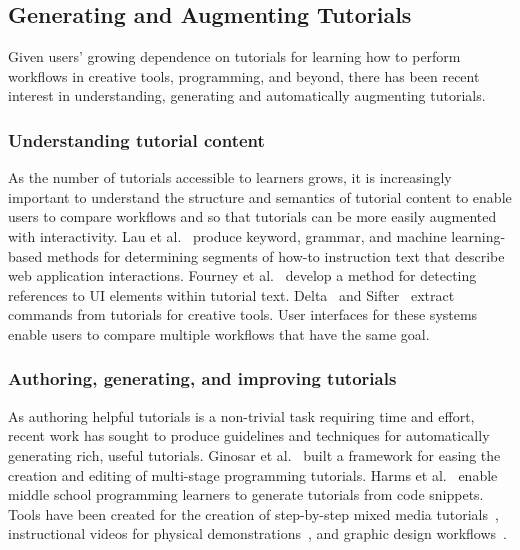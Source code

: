 \subsection{Generating and Augmenting Tutorials}

Given users' growing dependence on tutorials for learning how to perform workflows in creative tools, programming, and beyond, there has been recent interest in understanding, generating and automatically augmenting tutorials.

\subsubsection{Understanding tutorial content}

As the number of tutorials accessible to learners grows, it is increasingly important to understand the structure and semantics of tutorial content to enable users to compare workflows and so that tutorials can be more easily augmented with interactivity.
Lau et al.~\cite{lau_interpreting_2009} produce keyword, grammar, and machine learning-based methods for determining segments of how-to instruction text that describe web application interactions.
Fourney et al.~\cite{fourney_then_2012} develop a method for detecting references to UI elements within tutorial text.
Delta~\cite{kong_delta_2012} and Sifter~\cite{pavel_browsing_2013} extract commands from tutorials for creative tools.
User interfaces for these systems enable users to compare multiple workflows that have the same goal.

\subsubsection{Authoring, generating, and improving tutorials}

As authoring helpful tutorials is a non-trivial task requiring time and effort, recent work has sought to produce guidelines and techniques for automatically generating rich, useful tutorials.
Ginosar et al.~\cite{ginosar_authoring_2013} built a framework for easing the creation and editing of multi-stage programming tutorials.
Harms et al.~\cite{harms_automatically_2013} enable middle school programming learners to generate tutorials from code snippets.
Tools have been created for the creation of step-by-step mixed media tutorials~\cite{chi_mixt_2012}, instructional videos for physical demonstrations~\cite{chi_democut_2013}, and graphic design workflows~\cite{grossman_chronicle_2010}.


